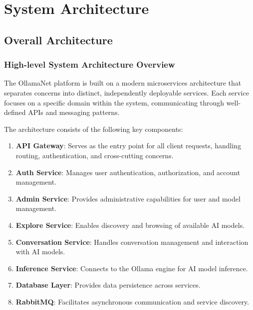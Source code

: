 \def\chapdir{./Chapter04}

\chapter{System Architecture} \label{ch:system-architecture}

\section{Overall Architecture}

\subsection{High-level System Architecture Overview}

The OllamaNet platform is built on a modern microservices architecture that separates concerns into distinct, independently deployable services. Each service focuses on a specific domain within the system, communicating through well-defined APIs and messaging patterns.


The architecture consists of the following key components:

\begin{enumerate}
   \item \textbf{API Gateway}: Serves as the entry point for all client requests, handling routing, authentication, and cross-cutting concerns.
   \item \textbf{Auth Service}: Manages user authentication, authorization, and account management.
   \item \textbf{Admin Service}: Provides administrative capabilities for user and model management.
   \item \textbf{Explore Service}: Enables discovery and browsing of available AI models.
   \item \textbf{Conversation Service}: Handles conversation management and interaction with AI models.
   \item \textbf{Inference Service}: Connects to the Ollama engine for AI model inference.
   \item \textbf{Database Layer}: Provides data persistence across services.
   \item \textbf{RabbitMQ}: Facilitates asynchronous communication and service discovery.
\end{enumerate}

